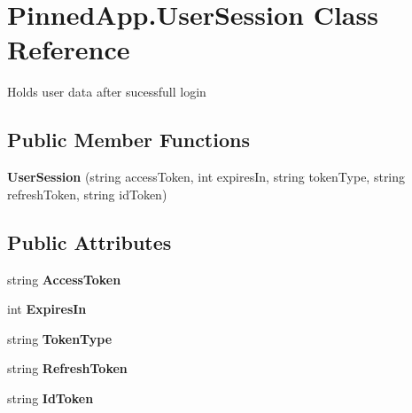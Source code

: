 \hypertarget{class_pinned_app_1_1_user_session}{}\section{Pinned\+App.\+User\+Session Class Reference}
\label{class_pinned_app_1_1_user_session}


Holds user data after sucessfull login  


\subsection*{Public Member Functions}
\begin{DoxyCompactItemize}
\item 
\mbox{\label{class_pinned_app_1_1_user_session_a78c51943ea1ef917b7c46f5df1d117ff}} 
{\bfseries User\+Session} (string access\+Token, int expires\+In, string token\+Type, string refresh\+Token, string id\+Token)
\end{DoxyCompactItemize}
\subsection*{Public Attributes}
\begin{DoxyCompactItemize}
\item 
\mbox{\label{class_pinned_app_1_1_user_session_a5cf77d63e8769868e6155b1ffaf3e7ec}} 
string {\bfseries Access\+Token}
\item 
\mbox{\label{class_pinned_app_1_1_user_session_a640f2940120720521a4f88b0e800235d}} 
int {\bfseries Expires\+In}
\item 
\mbox{\label{class_pinned_app_1_1_user_session_a61b82f633dbcb16bb03e9aea715d37ad}} 
string {\bfseries Token\+Type}
\item 
\mbox{\label{class_pinned_app_1_1_user_session_aa006afd181efc6cc25047c16498c6b41}} 
string {\bfseries Refresh\+Token}
\item 
\mbox{\label{class_pinned_app_1_1_user_session_a59b7a2daa1a019d7a537bf67fd25a58b}} 
string {\bfseries Id\+Token}
\end{DoxyCompactItemize}


